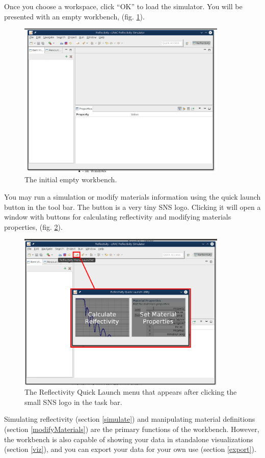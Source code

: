 Once you choose a workspace, click ``OK'' to load the simulator. You will be
presented with an empty workbench, (fig. \ref{workbench}).

\begin{figure}[!h]
\centering
\includegraphics[width=10cm]{images/workbench.png}
\caption{The initial empty workbench.}
\label{workbench}
\end{figure}

You may run a simulation or modify materials information using the quick launch
button in the tool bar. The button is a very tiny SNS logo. Clicking it
will open a window with buttons for calculating reflectivity and modifying
materials properties, (fig. \ref{launcher}).

\begin{figure}[!h]
\centering
\includegraphics[width=10cm]{images/menuLauncher.png}
\caption{The Reflectivity Quick Launch menu that appears after clicking the
small SNS logo in the task bar.}
\label{launcher}
\end{figure}

Simulating reflectivity (section \ref{simulate}) and manipulating material
definitions (section \ref{modifyMaterials}) are the primary functions of the
workbench. However, the workbench is also capable of showing your data in
standalone visualizations (section \ref{viz}), and you can export your data for
your own use (section \ref{export}).

